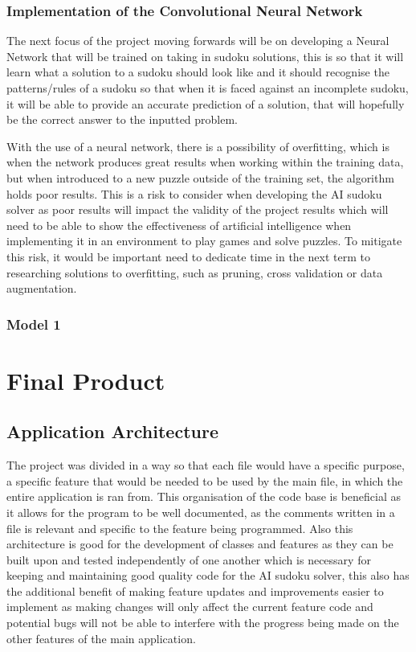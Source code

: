 \documentclass[]{final_report}
\begin{document}
\subsection{Implementation of the Convolutional Neural Network}

The next focus of the project moving forwards will be on developing a Neural Network that will be trained on taking in sudoku solutions, this is so that it will learn what a solution to a sudoku should look like and it should recognise the patterns/rules of a sudoku so that when it is faced against an incomplete sudoku, it will be able to provide an accurate prediction of a solution, that will hopefully be the correct answer to the inputted problem.

With the use of a neural network, there is a possibility of overfitting, which is when the network produces great results when working within the training data, but when introduced to a new puzzle outside of the training set, the algorithm holds poor results. This is a risk to consider when developing the AI sudoku solver as poor results will impact the validity of the project results which will need to be able to show the effectiveness of artificial intelligence when implementing it in an environment to play games and solve puzzles. To mitigate this risk, it would be important need to dedicate time in the next term to researching solutions to overfitting, such as pruning, cross validation or data augmentation. 

\subsection{Model 1}

\chapter{Final Product}

\section{Application Architecture}

The project was divided in a way so that each file would have a specific purpose, a specific feature that would be needed to be used by the main file, in which the entire application is ran from. This organisation of the code base is beneficial as it allows for the program to be well documented, as the comments written in a file is relevant and specific to the feature being programmed. Also this architecture is good for the development of classes and features as they can be built upon and tested independently of one another which is necessary for keeping and maintaining good quality code for the AI sudoku solver, this also has the additional benefit of making feature updates and improvements easier to implement as making changes will only affect the current feature code and potential bugs will not be able to interfere with the progress being made on the other features of the main application. 
\end{document}
